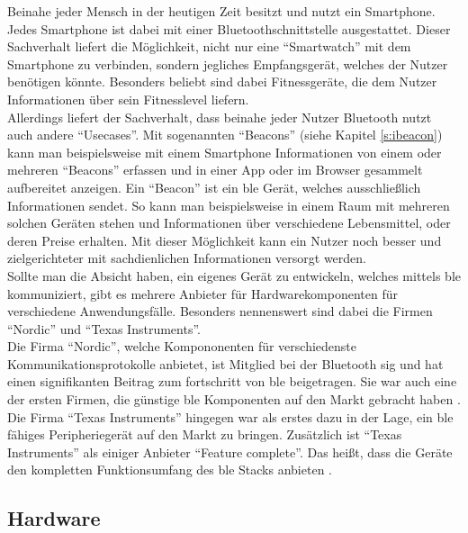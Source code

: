 \noindent Beinahe jeder Mensch in der heutigen Zeit besitzt und nutzt ein Smartphone. Jedes Smartphone ist dabei mit einer Bluetoothschnittstelle ausgestattet. Dieser Sachverhalt liefert die Möglichkeit, nicht nur eine "`Smartwatch"' mit dem Smartphone zu verbinden, sondern jegliches Empfangsgerät, welches der Nutzer benötigen könnte. Besonders beliebt sind dabei Fitnessgeräte, die dem Nutzer Informationen über sein Fitnesslevel liefern.\\

\noindent Allerdings liefert der Sachverhalt, dass beinahe jeder Nutzer Bluetooth nutzt auch andere "`Usecases"'. Mit sogenannten "`Beacons"' (siehe Kapitel \ref{s:ibeacon}) kann man beispielsweise mit einem Smartphone Informationen von einem oder mehreren "`Beacons"' erfassen und in einer App oder im Browser gesammelt aufbereitet anzeigen. Ein "`Beacon"' ist ein \ac{ble} Gerät, welches ausschließlich Informationen sendet. So kann man beispielsweise in einem Raum mit mehreren solchen Geräten stehen und Informationen über verschiedene Lebensmittel, oder deren Preise erhalten. Mit dieser Möglichkeit kann ein Nutzer noch besser und zielgerichteter mit sachdienlichen Informationen versorgt werden.\\

\noindent Sollte man die Absicht haben, ein eigenes Gerät zu entwickeln, welches mittels \ac{ble} kommuniziert, gibt es mehrere Anbieter für Hardwarekomponenten für verschiedene Anwendungsfälle. Besonders nennenswert sind dabei die Firmen "`Nordic"' und "`Texas Instruments"'.\\

\noindent Die Firma "`Nordic"', welche Kompononenten für verschiedenste Kommunikationsprotokolle anbietet, ist Mitglied bei der Bluetooth \ac{sig} und hat einen signifikanten Beitrag zum fortschritt von \ac{ble} beigetragen. Sie war auch eine der ersten Firmen, die günstige \ac{ble} Komponenten auf den Markt gebracht haben \cite[Seite 75]{Townsend14:GSB}.\\

\noindent Die Firma "`Texas Instruments"' hingegen war als erstes dazu in der Lage, ein \ac{ble} fähiges Peripheriegerät auf den Markt zu bringen. Zusätzlich ist "`Texas Instruments"' als einiger Anbieter "`Feature complete"'. Das heißt, dass die Geräte den kompletten Funktionsumfang des \ac{ble} Stacks anbieten \cite[Seite 79]{Townsend14:GSB}.\\ 

\subsection{Hardware}
\label{ss:grundlagen:hardware}

